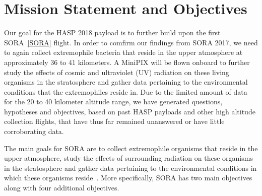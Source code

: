 \section{Mission Statement and Objectives}
\label{sec:Introduction}

Our goal for the HASP 2018 payload is to further build upon the first SORA~\ref{SORA} flight.  In order to comfirm our findings from SORA 2017, we need to again collect extremophile bacteria that reside in the upper atmosphere at approximately 36 to 41 kilometers.  A MiniPIX will be flown onboard to further study the effects of cosmic and ultraviolet (UV) radiation on these living organisms in the stratosphere and gather data pertaining to the environmental conditions that the extremophiles reside in. Due to the limited amount of data for the 20 to 40 kilometer altitude range, we have generated questions, hypotheses and objectives, based on past HASP payloads and other high altitude collection flights, that have thus far remained unanswered or have little corroborating data.


The main goals for SORA are to collect extremophile organisms that reside in the upper atmosphere, study the effects of surrounding radiation on these organisms in the stratosphere and gather data pertaining to the environmental conditions in which these organisms reside~\cite{SORA}.  More specifically, SORA has two main objectives along with four additional objectives.\\

